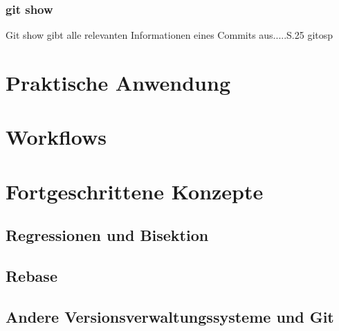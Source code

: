 \subsubsection{git show}\label{sec:gitshow}
Git show gibt alle relevanten Informationen eines Commits aus.....S.25 gitosp

\section{Praktische Anwendung}
\label{sec:Praxis}
\section{Workflows}
\label{sec:Workflows}
\section{Fortgeschrittene Konzepte}
\label{sec:FortgeschritteneKonzepte}
\subsection{Regressionen und Bisektion}\label{sec:bisec}
\subsection{Rebase}\label{sec:rebase}
\subsection{Andere Versionsverwaltungssysteme und Git}
\label{sec:AndereVersionsverwaltungssystemeundGit}
